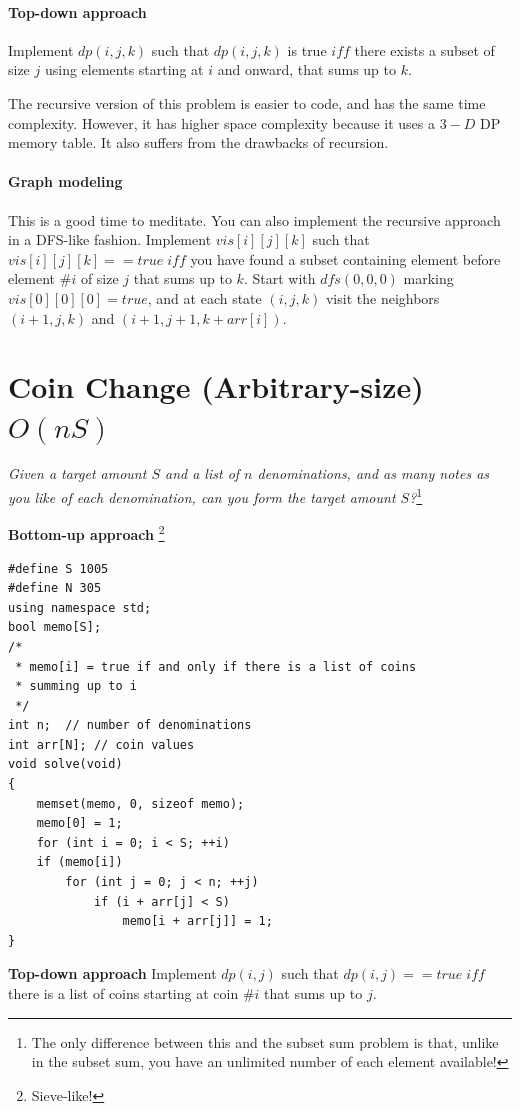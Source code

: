 \documentclass[12pt]{book}
\begin{document}
\paragraph{Top-down approach}
Implement $dp(i, j, k)$ such that $dp(i, j, k)$ is true $iff$ there exists a subset of size $j$ using elements starting at $i$ and onward, that sums up to $k$.

The recursive version of this problem is easier to code, and has the same time complexity. However, it has higher space complexity because it uses a $3-D$ DP memory table. It also suffers from the drawbacks of recursion.
\paragraph{Graph modeling}
This is a good time to meditate. You can also implement the recursive approach in a DFS-like fashion. Implement $vis[i][j][k]$ such that $vis[i][j][k] == true\;iff$ you have found a subset containing element before element $\#i$ of size $j$ that sums up to $k$. Start with $dfs(0, 0, 0)$ marking $vis[0][0][0] = true$, and at each state $(i, j, k)$ visit the neighbors $(i + 1, j, k)$ and $(i + 1, j + 1, k + arr[i])$.
\section{Coin Change (Arbitrary-size)$O(nS)$}
\textit{Given a target amount $S$ and a list of $n$ denominations, and as many notes as you like of each denomination, can you form the target amount $S$?}\footnote{The only difference between this and the subset sum problem is that, unlike in the subset sum, you have an unlimited number of each element available!}

\textbf{Bottom-up approach} \footnote{Sieve-like!}
\begin{verbatim}
#define S 1005
#define N 305
using namespace std;
bool memo[S];
/*
 * memo[i] = true if and only if there is a list of coins
 * summing up to i
 */
int n;	// number of denominations
int arr[N];	// coin values
void solve(void)
{
	memset(memo, 0, sizeof memo);
	memo[0] = 1;
	for (int i = 0; i < S; ++i)
	if (memo[i])
		for (int j = 0; j < n; ++j)
			if (i + arr[j] < S)
				memo[i + arr[j]] = 1;
}
\end{verbatim}
\textbf{Top-down approach}
Implement $dp(i, j)$ such that $dp(i, j) == true\; iff$ there is a list of coins starting at coin $\#i$ that sums up to $j$.
\end{document}

